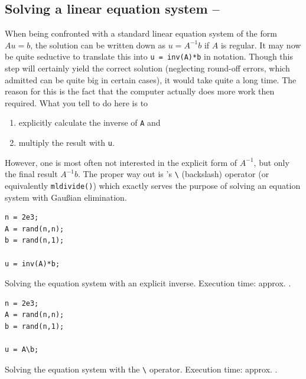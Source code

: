 % 
% 


\subsection{Solving a linear equation system -- \cleansymbol\cleansymbol\fastsymbol\fastsymbol\fastsymbol}
When being confronted with a standard linear equation system of the form $Au=b$, the solution can be written down as $u = A^{-1}b$ if $A$ is regular. It may now be quite seductive to translate this into \lstinline!u = inv(A)*b! in \matlab{} notation. Though this step will certainly yield the correct solution (neglecting round-off errors, which admitted can be quite big in certain cases), it would take quite a long time. The reason for this is the fact that the computer actually does more work then required. What you tell \matlab{} to do here is to
\begin{enumerate}
\item explicitly calculate the inverse of \lstinline!A! and
\item multiply the result with \lstinline!u!.
\end{enumerate}
However, one is most often not interested in the explicit form of $A^{-1}$, but only the final result $A^{-1}b$. The proper way out is \matlab{}'s \lstinline!\! (backslash) operator (or equivalently \lstinline!mldivide()!) which exactly serves the purpose of solving an equation system with Gau{\ss}ian elimination.


\hfill
\begin{minipage}[t]{.45\textwidth}
\begin{lstlisting}[framerule=2pt,rulecolor=\color{badred}]
n = 2e3;
A = rand(n,n);
b = rand(n,1);

u = inv(A)*b;
\end{lstlisting}
Solving the equation system with an explicit inverse. Execution time: approx. .
\end{minipage}
\hfill
\begin{minipage}[t]{.45\textwidth}
\begin{lstlisting}[framerule=2pt,rulecolor=\color{goodgreen}]
n = 2e3;
A = rand(n,n);
b = rand(n,1);

u = A\b;
\end{lstlisting}
Solving the equation system with the \lstinline!\! operator. Execution time: approx. .
\end{minipage}
\hfill

